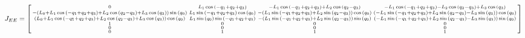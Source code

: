 \documentclass{article}
\begin{document}
\begin{equation}
	J_{EE} = \begin{bsmallmatrix}
	0 & L_{1} \cos{(- q_{1} + q_{2} + q_{3} )} & - L_{1} \cos{(- q_{1} + q_{2} + q_{3} )} + L_{2} \cos{(q_{2} -q_{3} )} & - L_{1} \cos{(- q_{1} + q_{2} + q_{3} )} - L_{2} \cos{(q_{2} - q_{3} )} + L_{3} \cos{(q_{3} )}\\
	- (L_{0} + L_{1} \cos{(- q_{1} + q_{2} + q_{3} )} + L_{2} \cos{(q_{2} - q_{3} )} + L_{3} \cos{(q_{3} )}) \sin{(q_{0})} & L_{1} \sin{(- q_{1} + q_{2} + q_{3} )} \cos{(q_{0} )} & - (L_{1} \sin{(- q_{1} + q_{2} + q_{3} )} + L_{2} \sin{(q_{2} - q_{3} )}) \cos{(q_{0} )} & (- L_{1} \sin{(- q_{1} + q_{2} + q_{3} )} + L_{2} \sin{(q_{2} - q_{3} )} - L_{3} \sin{(q_{3} )}) \cos{(q_{0} )}\\
	(L_{0} + L_{1} \cos{(- q_{1} + q_{2} + q_{3} )} + L_{2} \cos{(q_{2} - q_{3} )} + L_{3} \cos{(q_{3} )}) \cos{(q_{0} )} & L_{1} \sin{(q_{0} )} \sin{(- q_{1} + q_{2} + q_{3} )} & - (L_{1} \sin{(- q_{1} + q_{2} + q_{3} )} + L_{2} \sin{(q_{2} - q_{3} )}) \sin{(q_{0} )} &(- L_{1} \sin{(- q_{1} + q_{2} + q_{3} )} + L_{2} \sin{(q_{2} - q_{3} )} - L_{3} \sin{(q_{3} )}) \sin{(q_{0} )}\\
	1 & 0 & 0 & 0\\
	0 & 0 & 0 & 0\\
	0 & 1 & 1 & 1
\end{bsmallmatrix}
\end{equation}
\end{document}

